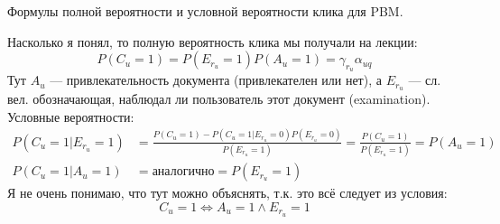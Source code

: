 \begin{task}[7]
Формулы полной вероятности и условной вероятности клика для PBM.
\end{task}
\begin{solution}
Насколько я понял, то полную вероятность клика мы получали на лекции:
\begin{equation*}
P(C_u = 1) = P(E_{r_u} = 1)P(A_u=1) = \gamma_{r_u} \alpha_{uq}
\end{equation*}
Тут $A_u$ --- привлекательность документа (привлекателен или нет), а $E_{r_u}$ --- сл. вел. обозначающая, наблюдал ли пользователь этот документ (examination).
Условные вероятности:
\begin{align*}
	P(C_u = 1 | E_{r_u} = 1) &= \frac{P(C_u = 1)-P(C_u = 1 | E_{r_u} = 0)P(E_{r_u} = 0)}{P(E_{r_u} = 1)} = \frac{P(C_u = 1)}{P(E_{r_u} = 1)} = P(A_u=1)\\
	P(C_u = 1| A_u = 1) &= \text{аналогично} = P(E_{r_u}=1)
\end{align*}
Я не очень понимаю, что тут можно объяснять, т.к. это всё следует из условия: 
\begin{equation*}
C_u = 1 \iff A_u = 1 \land E_{r_u} = 1
\end{equation*}
\end{solution}

